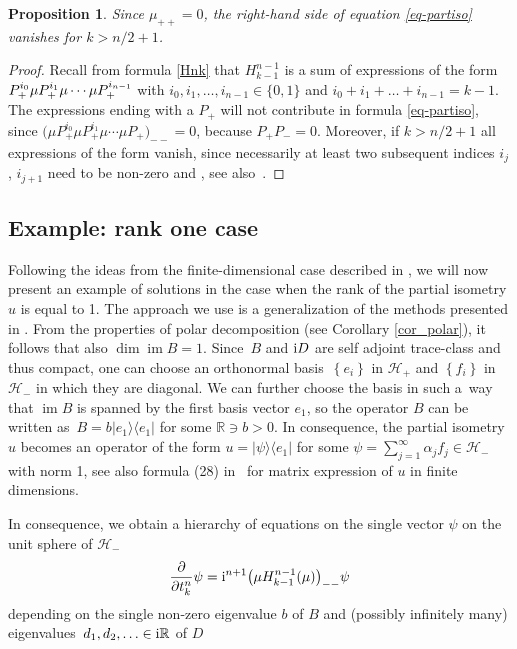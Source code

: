 \documentclass[pdftex]{sigma}
\newtheorem{prop}[thm]{Proposition}
\theoremstyle{definition}
\numberwithin{equation}{section}
\newcommand{\proj}[2]{|#1 \rangle \langle #2|}
\newcommand{\R}{\mathbb R}
\renewcommand{\H}{\mathcal{H}}
\DeclareMathOperator{\im}{im}
\newcommand{\set}[1]{\left\{#1\right\}}
\newcommand{\be}{\begin{equation}}
\newcommand{\ee}{\end{equation}}
\begin{document}
\begin{prop}\label{rem:limitk}
Since $\mu_{++}=0$, the right-hand side of equation \eqref{eq-partiso} vanishes for $k> n/2+1$.
\end{prop}

\begin{proof}
Recall from formula \eqref{Hnk} that $H^{n-1}_{k-1}$ is a sum of expressions of the form
$ P_+^{i_0}\mu P_+^{i_1}\mu\cdots \allowbreak\smash{\mu P_+^{i_{n-1}}}$
with $i_0, i_1, \dots, i_{n-1}\in\{0,1\}$ and $i_0+i_1+\dots+i_{n-1} = k-1$.
The expressions ending with a $P_+$ will not contribute in formula \eqref{eq-partiso}, since
$
\bigl(\mu P_+^{i_0}\mu P_+^{i_1}\mu\cdots \mu P_+\bigr)_{--} = 0$,
because $P_+ P_- = 0$.
Moreover, if $k> n/2+1$ all expressions of the form
vanish, since necessarily at least two subsequent indices $i_j$, $i_{j+1}$ need to be non-zero and ,
see also~\cite[Proposition~2]{GT-partiso-bial}.
\end{proof}

\subsection{Example: rank one case}\label{ex:rank1}

Following the ideas from the finite-dimensional case described in \cite{GT-partiso-bial}, we will now present an example of solutions in the case when the rank of the partial isometry $u$ is equal to 1. The approach we use is a generalization of the methods presented in \cite[Section 4]{GT-partiso-bial}. From the properties of polar decomposition (see Corollary \ref{cor_polar}), it follows that also $\dim\im B=1$.
Since~$B$ and ${\rm i}D$ are self adjoint trace-class and thus compact, one can choose an orthonormal basis~$\set{e_i}$ in $\H_+$ and $\set{f_i}$ in $\H_-$ in which they are diagonal.
We can further choose the basis in such a~way that $\im B$ is spanned by the first basis vector $e_1$, so the operator $B$ can be written as~${ B = b\proj{e_1}{e_1}}$
for some $\R\ni b>0$. In consequence, the partial isometry $u$ becomes an operator of the form
$u = \proj\psi{e_1}$
for some
$\psi = \sum_{j=1}^\infty \alpha_j f_j\in\H_-$
with norm 1, see also formula (28) in~\cite{GT-partiso-bial} for matrix expression of $u$ in finite dimensions.

In consequence, we obtain a hierarchy of equations on the single vector $\psi$ on the unit sphere of $\H_-$
\be \label{eq-partiso2} \frac\partial{\partial t^n_k} \psi = {\rm i}^{n+1}\bigl(\mu H^{n-1}_{k-1}(\mu)\bigr)_{--}\psi\ee
depending on the single non-zero eigenvalue $b$ of $B$ and (possibly infinitely many) eigenvalues~${d_1, d_2,\ldots\in {\rm i}\R}$ of $D$
\end{document}
